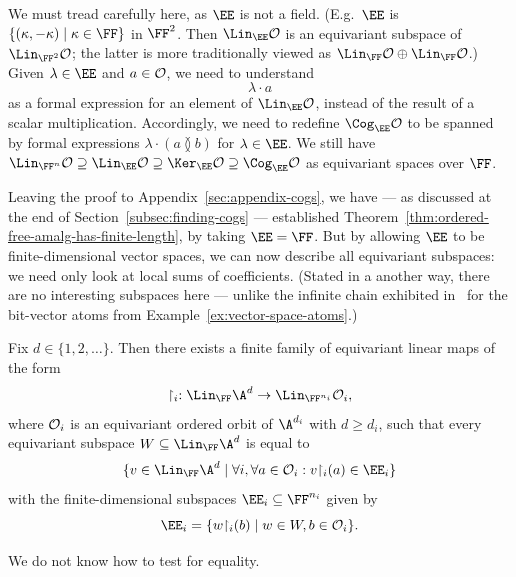 \begin{remark}\label{rem:FF-EE}
We must tread carefully here, as $\EE$ is not a field.
(E.g.~$\EE$ is $\{ (\kappa, -\kappa) \mid \kappa \in \FF \}$ in $\FF^2$. 
Then $\Lin_\EE \cal O$ is an equivariant subspace of $\Lin_{\FF^2} \cal O$; 
the latter is more traditionally viewed as $\Lin_\FF \cal O \oplus \Lin_\FF \cal O$.)
Given $\lambda \in \EE$ and $a \in \cal O$, we need to understand
\[
    \lambda \cdot a
\]
as a formal expression for an element of $\Lin_\EE \cal O$, instead of the result of a scalar multiplication.
Accordingly, we need to redefine $\Cog_\EE\cal O$ to be spanned by formal expressions $\lambda\cdot(a \between b)$ for $\lambda\in\EE$. 
We still have $\Lin_{\FF^n} \cal O \supseteq \Lin_\EE \cal O \supseteq \Ker_\EE \cal O \supseteq \Cog_\EE \cal O$ as equivariant spaces over $\FF$.
\end{remark}

Leaving the proof to Appendix~\ref{sec:appendix-cogs}, 
we have --- as discussed at the end of Section~\ref{subsec:finding-cogs} --- established Theorem~\ref{thm:ordered-free-amalg-has-finite-length}, by taking $\EE = \FF$.
But by allowing $\EE$ to be finite-dimensional vector spaces, we can now describe all equivariant subspaces: 
we need only look at local sums of coefficients.
(Stated in a another way, there are no interesting subspaces here --- 
unlike the infinite chain exhibited in~\cite[Thm.~4.14]{BFKM24} for the bit-vector atoms from Example~\ref{ex:vector-space-atoms}.) 

\begin{theorem}\label{thm:coeff-approximation}
    Fix $d \in \{1, 2, \dots\}$. 
    Then there exists a finite family of equivariant linear maps of the form
    \[
        \restriction_i : \Lin_\FF \A^d \to \Lin_{\FF^{n_i}} \cal O_i,
    \]
    where $\cal O_i$ is an equivariant ordered orbit of $\A^{d_i}$ with $d \geq d_i$, 
    such that every equivariant subspace $W \subseteq \Lin_\FF \A^d$ is equal to
    \begin{equation}\label{eq:equiv-subsp}
        \{v \in \Lin_\FF \A^d \mid \forall i, \forall a \in \cal{O}_i : v{\restriction_i}(a) \in \EE_i \}
    \end{equation}
    with the finite-dimensional subspaces $\EE_i \subseteq \FF^{n_i}$ given by
    \[
        \EE_i = \{w {\restriction_i}(b) \mid w \in W, b \in \cal O_i \}.
    \]
\end{theorem}
We do not know how to test for equality.

